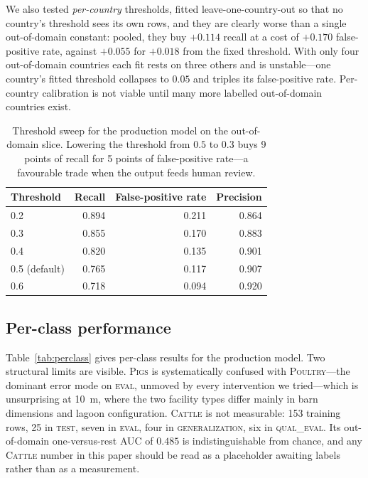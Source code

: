 \documentclass[11pt,a4paper]{article}
\begin{document}
We also tested \emph{per-country} thresholds, fitted leave-one-country-out so
that no country's threshold sees its own rows, and they are clearly worse than a
single out-of-domain constant: pooled, they buy $+0.114$ recall at a cost of
$+0.170$ false-positive rate, against $+0.055$ for $+0.018$ from the fixed
threshold. With only four out-of-domain countries each fit rests on three others
and is unstable---one country's fitted threshold collapses to $0.05$ and triples
its false-positive rate. Per-country calibration is not viable until many more
labelled out-of-domain countries exist.

\begin{table}[t]
\centering
\small
\caption{Threshold sweep for the production model on the out-of-domain slice.
Lowering the threshold from $0.5$ to $0.3$ buys 9 points of recall for 5 points
of false-positive rate---a favourable trade when the output feeds human review.}
\label{tab:thresholds}
\begin{tabular}{lrrr}
\toprule
Threshold & Recall & False-positive rate & Precision \\
\midrule
0.2 & 0.894 & 0.211 & 0.864 \\
0.3 & 0.855 & 0.170 & 0.883 \\
0.4 & 0.820 & 0.135 & 0.901 \\
0.5 (default) & 0.765 & 0.117 & 0.907 \\
0.6 & 0.718 & 0.094 & 0.920 \\
\bottomrule
\end{tabular}
\end{table}

\subsection{Per-class performance}
\label{sec:perclass}

Table~\ref{tab:perclass} gives per-class results for the production model. Two
structural limits are visible. \textsc{Pigs} is systematically confused with
\textsc{Poultry}---the dominant error mode on \textsc{eval}, unmoved by every
intervention we tried---which is unsurprising at \SI{10}{\metre}, where the two
facility types differ mainly in barn dimensions and lagoon configuration.
\textsc{Cattle} is not measurable: 153 training rows, 25 in \textsc{test}, seven
in \textsc{eval}, four in \textsc{generalization}, six in \textsc{qual\_eval}.
Its out-of-domain one-versus-rest AUC of $0.485$ is indistinguishable from
chance, and any \textsc{Cattle} number in this paper should be read as a
placeholder awaiting labels rather than as a measurement.
\end{document}
